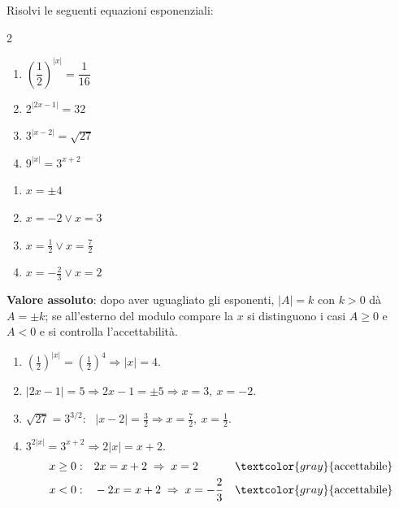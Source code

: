 \begin{question}[ID=4.2, subtitle={Valore assoluto e riduzione alla stessa base}, difficulty=media, tags={equazioni, esponenziali, valore assoluto}]
Risolvi le seguenti equazioni esponenziali:
\begin{center}\begin{minipage}{0.92\linewidth}
\begin{multicols}{2}
\begin{enumerate}[leftmargin=3.2cm]
\item $\left(\dfrac{1}{2}\right)^{|x|} = \dfrac{1}{16}$
\item $2^{|2x-1|} = 32$
\item $3^{|x-2|} = \sqrt{27}$
\item $9^{|x|} = 3^{x+2}$
\end{enumerate}
\end{multicols}
\end{minipage}\end{center}
\begin{solution}
\begin{enumerate}
    \item $x=\pm4$
    \item $x=-2\vee x=3$
    \item $x=\tfrac12\vee x=\tfrac72$
    \item $x=-\tfrac23\vee x=2$
\end{enumerate}
\end{solution}
\begin{explanation}
\textbf{Valore assoluto}: dopo aver uguagliato gli esponenti, $|A|=k$ con $k>0$ dà $A=\pm k$; se all'esterno del modulo compare la $x$ si distinguono i casi $A\geq0$ e $A<0$ e si controlla l'accettabilità.
\begin{enumerate}
    \item $\left(\tfrac12\right)^{|x|}=\left(\tfrac12\right)^4 \Rightarrow |x|=4$.
    \item $|2x-1|=5 \Rightarrow 2x-1=\pm5 \Rightarrow x=3,\ x=-2$.
    \item $\sqrt{27}=3^{3/2}$: \ $|x-2|=\tfrac32 \Rightarrow x=\tfrac72,\ x=\tfrac12$.
    \item $3^{2|x|}=3^{x+2} \Rightarrow 2|x|=x+2$.
    \[\begin{aligned}
    x\geq0: &\quad 2x=x+2 \;\Rightarrow\; x=2 && \textcolor{gray}{\text{accettabile}}\\
    x<0: &\quad -2x=x+2 \;\Rightarrow\; x=-\dfrac23 && \textcolor{gray}{\text{accettabile}}
    \end{aligned}\]
\end{enumerate}
\end{explanation}
\end{question}

